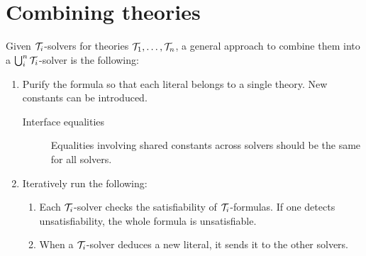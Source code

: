 \section{Combining theories}

Given $\mathcal{T}_i$-solvers for theories $\mathcal{T}_1, \dots, \mathcal{T}_n$,
a general approach to combine them into a $\bigcup_i^n \mathcal{T}_i$-solver is the following:
\begin{enumerate}
    \item Purify the formula so that each literal belongs to a single theory. New constants can be introduced.

        \begin{description}
            \item[Interface equalities] Equalities involving shared constants across solvers should be the same for all solvers.
        \end{description}
    \item Iteratively run the following:
    \begin{enumerate}
        \item Each $\mathcal{T}_i$-solver checks the satisfiability of $\mathcal{T}_i$-formulas. If one detects unsatisfiability, the whole formula is unsatisfiable.
        \item When a $\mathcal{T}_i$-solver deduces a new literal, it sends it to the other solvers.
    \end{enumerate}
\end{enumerate}

